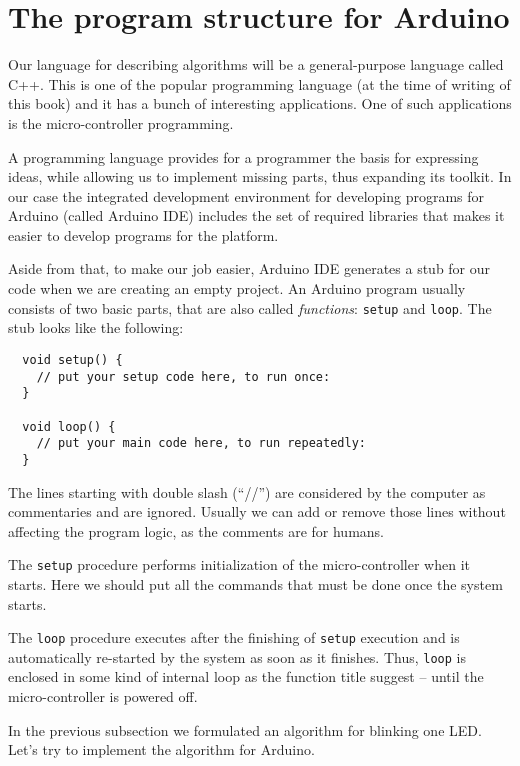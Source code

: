\documentclass[../sparc.tex]{subfiles}
\begin{document}
\section{The program structure for Arduino}

Our language for describing algorithms will be a general-purpose language called
C++.  This is one of the popular programming language (at the time of writing of
this book) and it has a bunch of interesting applications.  One of such
applications is the micro-controller programming.

A programming language provides for a programmer the basis for expressing ideas,
while allowing us to implement missing parts, thus expanding its toolkit.  In
our case the integrated development environment for developing programs for
Arduino (called Arduino IDE) includes the set of required libraries that makes
it easier to develop programs for the platform.

Aside from that, to make our job easier, Arduino IDE generates a stub for our
code when we are creating an empty project.  An Arduino program usually consists
of two basic parts, that are also called \emph{functions}: \texttt{setup} and
\texttt{loop}.  The stub looks like the following:

\begin{verbatim}
  void setup() {
    // put your setup code here, to run once:
  }

  void loop() {
    // put your main code here, to run repeatedly:
  }
\end{verbatim}

The lines starting with double slash (``//'') are considered by the computer as
commentaries and are ignored.  Usually we can add or remove those lines without
affecting the program logic, as the comments are for humans.

The \texttt{setup} procedure performs initialization of the micro-controller
when it starts.  Here we should put all the commands that must be done once the
system starts.

The \texttt{loop} procedure executes after the finishing of \texttt{setup}
execution and is automatically re-started by the system as soon as it finishes.
Thus, \texttt{loop} is enclosed in some kind of internal loop as the function
title suggest -- until the micro-controller is powered off.

In the previous subsection we formulated an algorithm for blinking one LED.
Let's try to implement the algorithm for Arduino.
\end{document}
